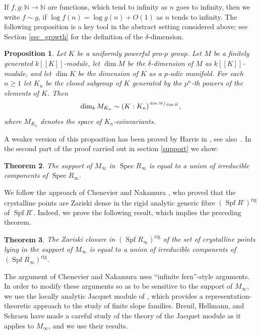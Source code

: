 \documentclass[11pt]{article}
\newcommand{\ssquare}{{\scriptscriptstyle\square}}
\newtheorem{prop}{Proposition}[section]
\newtheorem{thm}[prop]{Theorem}
\theoremstyle{definition}
\DeclareMathOperator{\Spf}{Spf}
\DeclareMathOperator{\Spec}{Spec}
\newcommand{\br}[1]{[\![#1]\!]}
\newcommand\rig{\mathrm{rig}}
\begin{document}
If $f, g:\mathbb N\to \mathbb N$ are functions, which tend to infinity as $n$ goes to infinity, then we write $f\sim g$, if $\log f(n)=\log g(n) + O(1)$ as $n$ tends to infinity.
The following proposition is a key tool in the abstract setting considered above; see Section \ref{sec_growth} for the definition of the $\delta$-dimension.

\begin{prop}\label{growth_intro} Let $K$ be a uniformly powerful pro-$p$ group. Let $M$ be a
finitely generated $k\br{K}$-module, let $\dim M$ be the $\delta$-dimension of $M$ as $k\br{K}$-module, and let $\dim K$ be the dimension of $K$ as a $p$-adic manifold. For each $n\ge1$ let $K_n$ be the closed subgroup of $K$ generated by the $p^n$-th powers of the elements of $K$. Then
\[
\dim_k M_{K_n}\sim (K:K_n)^{\sfrac{\dim M}{\dim K}},
\]
where $M_{K_n}$ denotes the space of $K_n$-coinvariants.
\end{prop}

A weaker version of this proposition has been proved by Harris in \cite{harris}, see also~\cite{harris_err}. In the second part of the proof carried out in section
\ref{support} we show:

\begin{thm}\label{B} The support of $M_{\infty}$ in $\Spec R_{\infty}$
is equal to a union of irreducible components of $\Spec R_{\infty}$.
\end{thm}

We follow the approach of Chenevier \cite{Chenevier}
and Nakamura \cite{Nakamura}, who proved that
the crystalline points are Zariski dense in the rigid analytic generic
fibre $(\Spf R^\ssquare)^{\rig}$
of $\Spf R^\ssquare$. Indeed, we prove the following result,
which implies the preceding theorem.

\begin{thm}\label{C} The Zariski closure in $(\Spf R_{\infty})^{\rig}$
of the set of crystalline points lying in the support of $M_{\infty}$
is equal to
a union of irreducible components of $(\Spf R_{\infty})^{\rig}$.
\end{thm}

The argument of Chenevier and Nakamura uses ``infinite fern''-style
arguments. In order to modify these arguments so as to be sensitive
to the support of $M_{\infty}$, we use the locally analytic Jacquet
module of \cite{Jacquet-one}, which provides a representation-theoretic
approach to the study of finite slope families. Breuil, Hellmann,
and Schraen \cite{BHS} have made a careful study of the theory
of the Jacquet module as it applies to $M_{\infty}$, and we use
their results.
\end{document}
